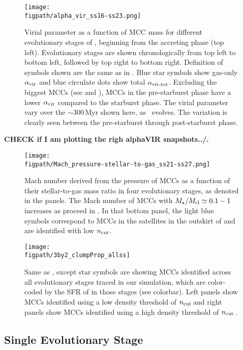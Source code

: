 \IfFileExists{emulateapjlegacy.cls}{\documentclass[iop]{emulateapjlegacy}}{\documentclass[iop]{emulateapj}}
\def\figpath{./Fig}
\begin{document}
\begin{figure*}[htbp]
\centering
\texttt{[image: \\figpath/alpha\_vir\_ss16-ss23.png]}
\caption{Virial parameter as a function of MCC mass for different evolutionary stages of \flower, beginning from the accreting phase (top left).
Evolutionary stages are shown chronologically from top left to bottom left, followed by top right to bottom right.
Definition of symbols shown are the same as in .
Blue star symbols show gas-only $\alpha_{\rm vir}$ and blue circulate dots show total $\alpha_{\rm vir, tot}$.
Excluding the biggest MCCs (see  and ), 
MCCs in the pre-starburst phase have a lower $\alpha_{\rm vir}$ compared to the starburst phase. 
The virial parameter vary over the $\sim$300\,Myr shown here, as \flower\ evolves.
The variation is clearly seen between the pre-starburst through post-starburst phase. 
\label{fig:alphaEvol}}
\end{figure*}
{\bf CHECK if I am plotting the righ alphaVIR snapshots../.}


\begin{figure}[htbp]
\centering
\texttt{[image: \\figpath/Mach\_pressure-stellar-to-gas\_ss21-ss27.png]}
\caption{
Mach number derived from the pressure of MCCs as a function of their stellar-to-gas mass ratio in four evolutionary stages, as denoted in the panels.
The Mach number of MCCs with $M_\star/M_{\rm cl} \simeq 0.1 - 1$ increases as \SF proceed in \flower. In that bottom panel, the 
light blue symbols correspond to MCCs in the satellites in the outskirt of \flower and are identified with low $n_{\rm cut}$.
\label{fig:Mach_stellarRatio}}
\end{figure}

\begin{figure*}
\centering
\texttt{[image: \\figpath/3by2\_clumpProp\_allss]}
\caption{Same as , except star symbols are showing MCCs identified across all evolutionary stages traced in our simulation, which are color-coded by the SFR of \flower in those stages (see colorbar). Left panels show MCCs identified using a low density threshold of $n_{\rm cut}$\,\cc and right panels show MCCs 
identified using a high density threshold of $n_{\rm cut}$\,\cc.
\label{fig:alpha16-28}}
\end{figure*}



\subsection{Single Evolutionary Stage}  \label{sec:singless}
\end{document}
